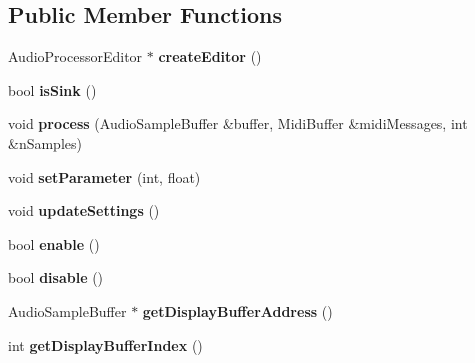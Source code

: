 \subsection*{Public Member Functions}
\begin{DoxyCompactItemize}
\item 
\hypertarget{classLfpDisplayNode_ac5f35b216ebabf0ceb16c83d799d21d6}{Audio\-Processor\-Editor $\ast$ {\bfseries create\-Editor} ()}\label{classLfpDisplayNode_ac5f35b216ebabf0ceb16c83d799d21d6}

\item 
\hypertarget{classLfpDisplayNode_a313f1eee04b338d4c73414bf898710ca}{bool {\bfseries is\-Sink} ()}\label{classLfpDisplayNode_a313f1eee04b338d4c73414bf898710ca}

\item 
\hypertarget{classLfpDisplayNode_ae2060971a75911cf7fc91f4729eddc00}{void {\bfseries process} (Audio\-Sample\-Buffer \&buffer, Midi\-Buffer \&midi\-Messages, int \&n\-Samples)}\label{classLfpDisplayNode_ae2060971a75911cf7fc91f4729eddc00}

\item 
\hypertarget{classLfpDisplayNode_a1646cac1cf79906c032123ef5145337a}{void {\bfseries set\-Parameter} (int, float)}\label{classLfpDisplayNode_a1646cac1cf79906c032123ef5145337a}

\item 
\hypertarget{classLfpDisplayNode_ad83ef4ae6e745f6d92b56306850c9033}{void {\bfseries update\-Settings} ()}\label{classLfpDisplayNode_ad83ef4ae6e745f6d92b56306850c9033}

\item 
\hypertarget{classLfpDisplayNode_a6eb5f8069d42b172bd02ae4a49e7e272}{bool {\bfseries enable} ()}\label{classLfpDisplayNode_a6eb5f8069d42b172bd02ae4a49e7e272}

\item 
\hypertarget{classLfpDisplayNode_a002144f0fd7488eb47b519842a7ad738}{bool {\bfseries disable} ()}\label{classLfpDisplayNode_a002144f0fd7488eb47b519842a7ad738}

\item 
\hypertarget{classLfpDisplayNode_ab426013a5ed9be3bda32a732348c7c56}{Audio\-Sample\-Buffer $\ast$ {\bfseries get\-Display\-Buffer\-Address} ()}\label{classLfpDisplayNode_ab426013a5ed9be3bda32a732348c7c56}

\item 
\hypertarget{classLfpDisplayNode_a68f45d41fb62d834f91e170e471d3172}{int {\bfseries get\-Display\-Buffer\-Index} ()}\label{classLfpDisplayNode_a68f45d41fb62d834f91e170e471d3172}

\end{DoxyCompactItemize}
